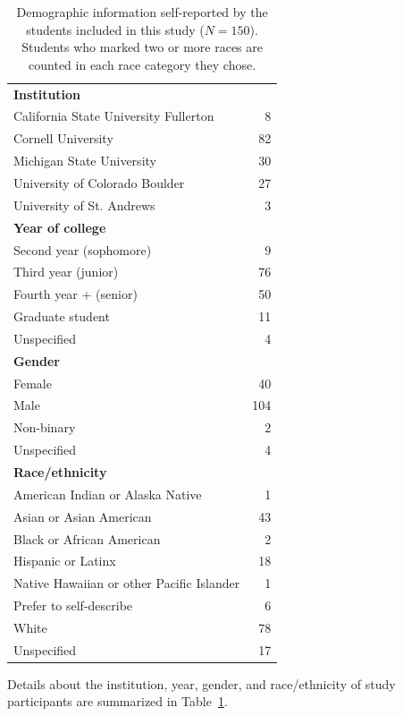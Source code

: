 \documentclass[english,aps,prstper,reprint,showpacs,longbibliography,superscriptaddress,nofootinbib]{revtex4-2}
\begin{document}
{\begin{table}[tb] 
  \caption{Demographic information self-reported by the students included in this study ($N=150$). Students who marked two or more races are counted in each race category they chose.}
  \label{ta:demographics}
  \begin{ruledtabular}
    \begin{tabular}{lr}
    \textbf{Institution} & \\
    \quad California State University Fullerton & 8\\
    \quad Cornell University & 82\\
    \quad Michigan State University & 30\\
    \quad University of Colorado Boulder & 27\\
    \quad University of St. Andrews & 3\\
    \textbf{Year of college} \\
    \quad Second year (sophomore) & 9\\
    \quad Third year (junior) & 76\\
    \quad Fourth year + (senior) & 50\\
    \quad Graduate student & 11\\
    \quad Unspecified & 4\\
    \textbf{Gender}\\
    \quad Female & 40\\
    \quad Male & 104\\
    \quad Non-binary & 2\\
    \quad Unspecified & 4\\
    \textbf{Race/ethnicity}\\
    \quad American Indian or Alaska Native & 1\\
    \quad Asian or Asian American & 43 \\
    \quad Black or African American & 2 \\
    \quad Hispanic or Latinx & 18 \\
    \quad Native Hawaiian or other Pacific Islander & 1\\
    \quad Prefer to self-describe & 6\\
    \quad White & 78\\
    \quad Unspecified & 17\\
    \end{tabular}
  \end{ruledtabular}
\end{table}

Details about the institution, year, gender, and race/ethnicity of study participants are summarized in Table~\ref{ta:demographics}.

}
\end{document}

